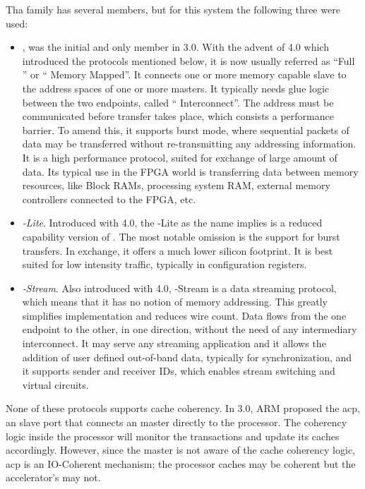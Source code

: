 Tha  family has several members, but for this system the following three were used:
\begin{itemize}
\item	\textit{}, was the initial and only member in  3.0. With the advent of  4.0 which introduced
	the protocols mentioned below, it is now usually referred as ``Full '' or `` Memory Mapped''.
	It connects one or more memory capable slave to the address spaces of 
	one or more masters. It typically needs glue logic between the two endpoints, called `` Interconnect''. 
	The address must be communicated before transfer takes place, which consists a performance barrier.
	To amend this, it supports burst mode, where sequential packets of data may be transferred without
	re-transmitting any addressing information. It is a high performance protocol, suited for exchange
	of large amount of data. Its typical use in the FPGA world is transferring data between memory resources,
 	like Block RAMs, processing system RAM, external memory controllers connected to the FPGA, etc.
\item	\textit{-Lite}. Introduced with  4.0, the -Lite as the  name implies is a reduced capability
	version of . The most notable omission is the support for burst transfers. In exchange, it offers
	a much lower silicon footprint. It is best suited for low intensity traffic, typically in configuration
	registers.
\item	\textit{-Stream}. Also introduced with  4.0, -Stream is a data streaming protocol, which means
	that it has no notion of memory addressing. This greatly simplifies implementation and reduces wire
	count. Data flows from the one endpoint to the other, in one direction, 
	without the need of any intermediary interconnect.
	It may serve any streaming application and it allows the addition of user defined out-of-band data,
	typically for synchronization, and it supports sender and receiver IDs, 
	which enables stream switching and virtual circuits.
\end{itemize}

None of these protocols supports cache coherency. 
In  3.0, ARM proposed the \gls{acp}, 
an  slave port that connects an  master directly to the processor.
The coherency logic inside the processor will monitor the transactions and update its caches accordingly.
However, since the  master is not aware of the cache coherency logic, \gls{acp} is an IO-Coherent mechanism;
the processor caches may be coherent but the accelerator's may not.

